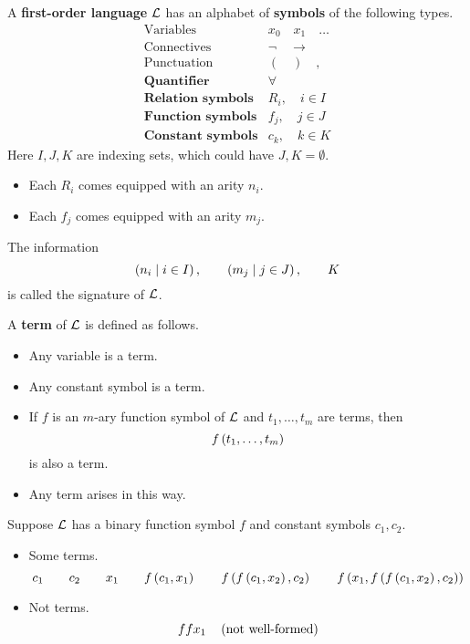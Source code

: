 \begin{definition}
\label{def:2.2.1}
A \textbf{first-order language} $ \mathcal{L} $ has an alphabet of \textbf{symbols} of the following types.
$$
\begin{array}{ll}
\text{Variables} & x_0 \quad x_1 \quad \dots \\
\text{Connectives} & \neg \quad \rightarrow \\
\text{Punctuation} & ( \quad ) \quad , \\
\textbf{Quantifier} & \forall \\
\textbf{Relation symbols} & R_i, \quad i \in I \\
\textbf{Function symbols} & f_j, \quad j \in J \\
\textbf{Constant symbols} & c_k, \quad k \in K
\end{array}
$$
Here $ I, J, K $ are indexing sets, which could have $ J, K = \emptyset $.
\begin{itemize}
\item Each $ R_i $ comes equipped with an arity $ n_i $.
\item Each $ f_j $ comes equipped with an arity $ m_j $.
\end{itemize}
The information
$$ \left( n_i \mid i \in I \right), \qquad \left( m_j \mid j \in J \right), \qquad K $$
is called the signature of $ \mathcal{L} $.
\end{definition}

\pagebreak

\begin{definition}
A \textbf{term} of $ \mathcal{L} $ is defined as follows.
\begin{itemize}
\item Any variable is a term.
\item Any constant symbol is a term.
\item If $ f $ is an $ m $-ary function symbol of $ \mathcal{L} $ and $ t_1, \dots, t_m $ are terms, then
$$ f\left( t_1, \dots, t_m \right) $$
is also a term.
\item Any term arises in this way.
\end{itemize}
\end{definition}

\begin{example2}
Suppose $ \mathcal{L} $ has a binary function symbol $ f $ and constant symbols $ c_1, c_2 $.
\begin{itemize}
\item Some terms.
$$ c_1 \qquad c_2 \qquad x_1 \qquad f\left( c_1, x_1 \right) \qquad f\left( f\left( c_1, x_2 \right), c_2 \right) \qquad f\left( x_1, f\left( f\left( c_1, x_2 \right), c_2 \right) \right) $$
\item Not terms.
$$ ffx_1 \quad \left( \text{not well-formed} \right) $$
\end{itemize}
\end{example2}

